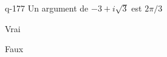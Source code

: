 \begin{truefalse}{q-177}
Un argument de $-3+i\sqrt 3$ est $2\pi/3$
\item Vrai
\item* Faux
\end{truefalse}

